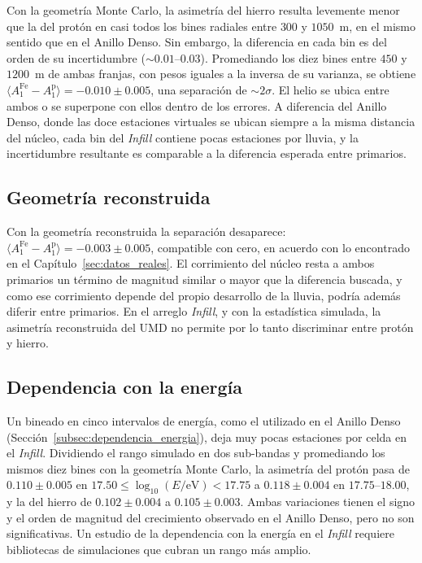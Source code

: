 {\leavevmode\color{blue}Con la geometría Monte Carlo, la asimetría del hierro resulta levemente menor que la del protón en casi todos los bines radiales entre $300$ y $1050$~m, en el mismo sentido que en el Anillo Denso. Sin embargo, la diferencia en cada bin es del orden de su incertidumbre ($\sim 0.01$--$0.03$). Promediando los diez bines entre $450$ y $1200$~m de ambas franjas, con pesos iguales a la inversa de su varianza, se obtiene $\langle A_1^{\mathrm{Fe}} - A_1^{\mathrm{p}} \rangle = -0.010 \pm 0.005$, una separación de $\sim 2\sigma$. El helio se ubica entre ambos o se superpone con ellos dentro de los errores. A diferencia del Anillo Denso, donde las doce estaciones virtuales se ubican siempre a la misma distancia del núcleo, cada bin del \textit{Infill} contiene pocas estaciones por lluvia, y la incertidumbre resultante es comparable a la diferencia esperada entre primarios.}

\subsection{Geometría reconstruida}

{\leavevmode\color{blue}Con la geometría reconstruida la separación desaparece: $\langle A_1^{\mathrm{Fe}} - A_1^{\mathrm{p}} \rangle = -0.003 \pm 0.005$, compatible con cero, en acuerdo con lo encontrado en el Capítulo~\ref{sec:datos_reales}. El corrimiento del núcleo resta a ambos primarios un término de magnitud similar o mayor que la diferencia buscada, y como ese corrimiento depende del propio desarrollo de la lluvia, podría además diferir entre primarios. En el arreglo \textit{Infill}, y con la estadística simulada, la asimetría reconstruida del UMD no permite por lo tanto discriminar entre protón y hierro.}

\subsection{Dependencia con la energía}

{\leavevmode\color{blue}Un bineado en cinco intervalos de energía, como el utilizado en el Anillo Denso (Sección~\ref{subsec:dependencia_energia}), deja muy pocas estaciones por celda en el \textit{Infill}. Dividiendo el rango simulado en dos sub-bandas y promediando los mismos diez bines con la geometría Monte Carlo, la asimetría del protón pasa de $0.110 \pm 0.005$ en $17.50 \leq \log_{10}(E/\mathrm{eV}) < 17.75$ a $0.118 \pm 0.004$ en $17.75$--$18.00$, y la del hierro de $0.102 \pm 0.004$ a $0.105 \pm 0.003$. Ambas variaciones tienen el signo y el orden de magnitud del crecimiento observado en el Anillo Denso, pero no son significativas. Un estudio de la dependencia con la energía en el \textit{Infill} requiere bibliotecas de simulaciones que cubran un rango más amplio.}

